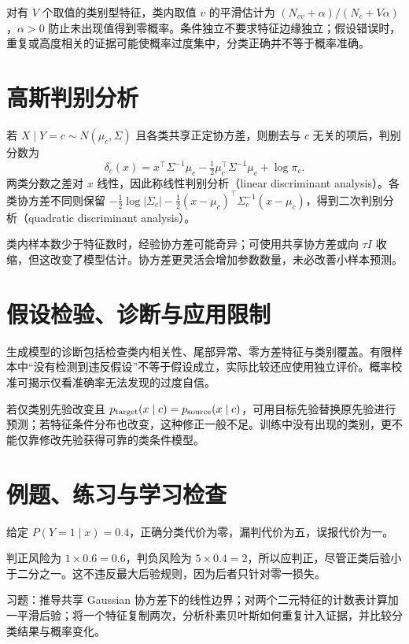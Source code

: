 对有 $V$ 个取值的类别型特征，类内取值 $v$ 的平滑估计为 $(N_{cv}+\alpha)/(N_c+V\alpha)$，$\alpha>0$ 防止未出现值得到零概率。条件独立不要求特征边缘独立；假设错误时，重复或高度相关的证据可能使概率过度集中，分类正确并不等于概率准确。

\section{高斯判别分析}

若 $X\mid Y=c\sim N(\mu_c,\Sigma)$ 且各类共享正定协方差，则删去与 $c$ 无关的项后，判别分数为
\begin{equation}
 \delta_c(x)=x^\top\Sigma^{-1}\mu_c
 -\tfrac12\mu_c^\top\Sigma^{-1}\mu_c+\log\pi_c.
 \label{eq:ml-gaussian-discriminant}
\end{equation}
两类分数之差对 $x$ 线性，因此称线性判别分析（linear discriminant analysis）。各类协方差不同则保留 $-\frac12\log|\Sigma_c|-\frac12(x-\mu_c)^\top\Sigma_c^{-1}(x-\mu_c)$，得到二次判别分析（quadratic discriminant analysis）。

类内样本数少于特征数时，经验协方差可能奇异；可使用共享协方差或向 $\tau I$ 收缩，但这改变了模型估计。协方差更灵活会增加参数数量，未必改善小样本预测。

\section{假设检验、诊断与应用限制}

生成模型的诊断包括检查类内相关性、尾部异常、零方差特征与类别覆盖。有限样本中“没有检测到违反假设”不等于假设成立，实际比较还应使用独立评价。概率校准可揭示仅看准确率无法发现的过度自信。

若仅类别先验改变且 $p_{\rm target}(x\mid c)=p_{\rm source}(x\mid c)$，可用目标先验替换原先验进行预测；若特征条件分布也改变，这种修正一般不足。训练中没有出现的类别，更不能仅靠修改先验获得可靠的类条件模型。

\section{例题、练习与学习检查}

\begin{example}[代价改变决策]
给定 $P(Y=1\mid x)=0.4$，正确分类代价为零，漏判代价为五，误报代价为一。
\end{example}
\begin{solve}
判正风险为 $1\times0.6=0.6$，判负风险为 $5\times0.4=2$，所以应判正，尽管正类后验小于二分之一。这不违反最大后验规则，因为后者只针对零一损失。
\end{solve}

习题：推导共享 Gaussian 协方差下的线性边界；对两个二元特征的计数表计算加一平滑后验；将一个特征复制两次，分析朴素贝叶斯如何重复计入证据，并比较分类结果与概率变化。





